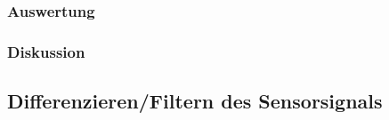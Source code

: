 \documentclass[12pt,a4paper]{article}
\begin{document}
\subsubsection*{Auswertung}
\subsubsection*{Diskussion}


\subsection{Differenzieren/Filtern des Sensorsignals}
\end{document}
